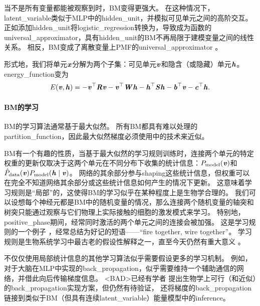 当不是所有变量都能被观察到时，\gls{BM}变得更强大。
在这种情况下，\gls{latent_variable}类似于\gls{MLP}中的\gls{hidden_unit}，并模拟可见单元之间的高阶交互。
正如添加\gls{hidden_unit}将\gls{logistic_regression}转换为，导致成为函数的\gls{universal_approximator}，具有\gls{hidden_unit}的\gls{BM}不再局限于建模变量之间的线性关系。
相反，\gls{BM}变成了离散变量上\gls{PMF}的\gls{universal_approximator} \citep{LeRoux-Bengio-2008}。


形式地，我们将单元$\boldsymbol{\mathit{x}}$分解为两个子集：可见单元$\boldsymbol{\mathit{v}}$和隐含（或隐藏）单元$\boldsymbol{\mathit{h}}$。
\gls{energy_function}变为
\begin{align}
 E(\boldsymbol{\mathit{v}}, \boldsymbol{\mathit{h}}) = -\boldsymbol{\mathit{v}}^\top \boldsymbol{\mathit{R}} \boldsymbol{\mathit{v}} - \boldsymbol{\mathit{v}}^\top \boldsymbol{\mathit{W}} \boldsymbol{\mathit{h}} - \boldsymbol{\mathit{h}}^\top \boldsymbol{\mathit{S}} \boldsymbol{\mathit{h}} - \boldsymbol{\mathit{b}}^\top \boldsymbol{\mathit{v}} - \boldsymbol{\mathit{c}}^\top \boldsymbol{\mathit{h}}.
\end{align}
\paragraph{\gls{BM}的学习}\gls{BM}的学习算法通常基于最大似然。
所有\gls{BM}都具有难以处理的\gls{partition_function}，因此最大似然梯度必须使用中的技术来近似。


\gls{BM}有一个有趣的性质，当基于最大似然的学习规则训练时，连接两个单元的特定权重的更新仅取决于这两个单元在不同分布下收集的统计信息：$P_{\text{model}}(\boldsymbol{\mathit{v}})$和$\hat{P}_{\text{data}}(\boldsymbol{\mathit{v}}) P_{\text{model}}(\boldsymbol{\mathit{h}}  \mid  \boldsymbol{\mathit{v}})$。
网络的其余部分参与\gls{shaping}这些统计信息，但权重可以在完全不知道网络其余部分或这些统计信息如何产生的情况下更新。
这意味着学习规则是``局部''的，这使得\gls{BM}的学习似乎在某种程度上是生物学合理的。
我们可以设想每个神经元都是\gls{BM}中的随机变量的情况，那么连接两个随机变量的轴突和树突只能通过观察与它们物理上实际接触的细胞的激发模式来学习。
特别地，\gls{positive_phase}期间，经常同时激活的两个单元之间的连接会被加强。
这是学习规则\citep{Hebb49}的一个例子 ，经常总结为好记的短语——``fire together, wire together''。
学习规则是生物系统学习中最古老的假设性解释之一，直至今天仍然有重大意义 \citep{DelGuidice-et-al-2009}。


不仅仅使用局部统计信息的其他学习算法似乎需要假设更多的学习机制。
例如，对于大脑在\gls{MLP}中实现的\gls{back_propagation}，似乎需要维持一个辅助通信的网络，并借此向后传输梯度信息。
<BAD>已经有学者\citep{Hinton-DL2007,Bengio-arxiv2015} 提出生物学上可行（和近似）的\gls{back_propagation}实现方案，但仍然有待验证，\citet{Bengio-arxiv2015} 还将梯度的\gls{back_propagation}链接到类似于\gls{BM}（但具有连续\gls{latent_variable}）能量模型中的\gls{inference}。

